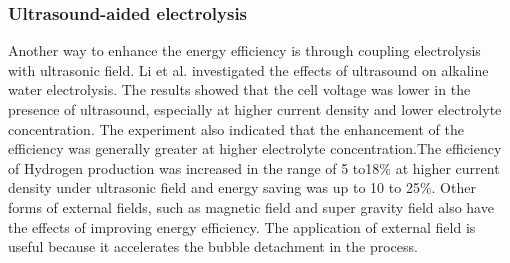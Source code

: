 \subsubsection{Ultrasound-aided electrolysis}
Another way to enhance the energy efficiency is through coupling electrolysis with ultrasonic field. Li et al.\cite{ultrasound} investigated the effects of ultrasound on alkaline water electrolysis. The results showed that the cell voltage was lower in the presence of ultrasound,
especially at higher current density and lower electrolyte concentration. The experiment also indicated that the enhancement of the efficiency was generally greater at higher electrolyte concentration.The efficiency of Hydrogen production was increased in the range of 5 to18\% at higher current density under ultrasonic field and energy saving was up to 10 to 25\%. Other forms of external fields, such as magnetic field and super gravity field also have the effects of improving energy efficiency. The application of external field is useful because it accelerates the bubble detachment in the process. \cite{review}

